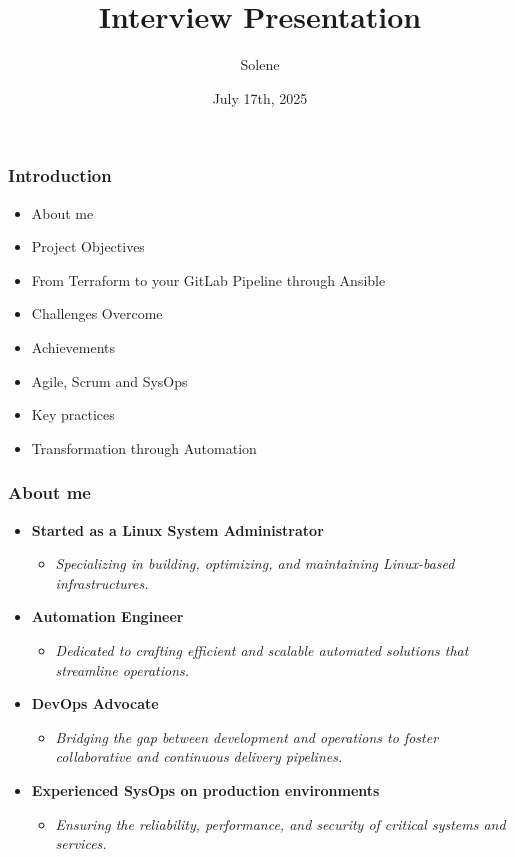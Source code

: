 \documentclass{beamer}
\title{Interview Presentation}
\author{Solene}
\date{July 17th, 2025}
\begin{document}
\frame{\titlepage}

\begin{frame}
\frametitle{Introduction}
\begin{itemize}
    \item About me
    \item Project Objectives
    \item From Terraform to your GitLab Pipeline through Ansible
    \item Challenges Overcome
    \item Achievements
    \item Agile, Scrum and SysOps
    \item Key practices
    \item Transformation through Automation
\end{itemize}
\end{frame}

\begin{frame}
\frametitle{About me}
\begin{itemize}
    \item \textbf{Started as a Linux System Administrator}  
    \begin{itemize}
        \item \textit{Specializing in building, optimizing, and maintaining Linux-based infrastructures.}
    \end{itemize}

    \item \textbf{Automation Engineer}  
    \begin{itemize}
        \item \textit{Dedicated to crafting efficient and scalable automated solutions that streamline operations.}
    \end{itemize}

    \item \textbf{DevOps Advocate}  
    \begin{itemize}
        \item \textit{Bridging the gap between development and operations to foster collaborative and continuous delivery pipelines.}
    \end{itemize}

    \item \textbf{Experienced SysOps on production environments}  
    \begin{itemize}
        \item \textit{Ensuring the reliability, performance, and security of critical systems and services.}
    \end{itemize}
\end{itemize}
\end{frame}
\end{document}
